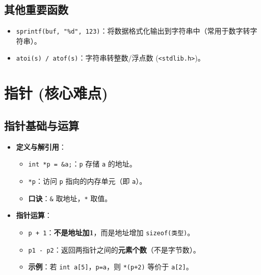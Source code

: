 \documentclass[a4paper,12pt]{article}
\begin{document}
\subsection{其他重要函数}
\begin{itemize}
    \item \texttt{sprintf(buf, "\%d", 123)}：将数据格式化输出到字符串中（常用于数字转字符串）。
    \item \texttt{atoi(s) / atof(s)}：字符串转整数/浮点数 (\texttt{<stdlib.h>})。
\end{itemize}

\section{指针 (核心难点)}

\subsection{指针基础与运算}
\label{sec:pointer_basics}
\begin{itemize}
    \item \textbf{定义与解引用}：
    \begin{itemize}
        \item \texttt{int *p = \&a;}：\texttt{p} 存储 \texttt{a} 的地址。
        \item \texttt{*p}：访问 \texttt{p} 指向的内存单元（即 \texttt{a}）。
        \item \textbf{口诀}：\texttt{\&} 取地址，\texttt{*} 取值。
    \end{itemize}
    \item \textbf{指针运算}：
    \begin{itemize}
        \item \texttt{p + 1}：\textbf{不是地址加1}，而是地址增加 \texttt{sizeof(类型)}。
        \item \texttt{p1 - p2}：返回两指针之间的\textbf{元素个数}（不是字节数）。
        \item \textbf{示例}：若 \texttt{int a[5]}，\texttt{p=a}，则 \texttt{*(p+2)} 等价于 \texttt{a[2]}。
    \end{itemize}
\end{itemize}
\end{document}
